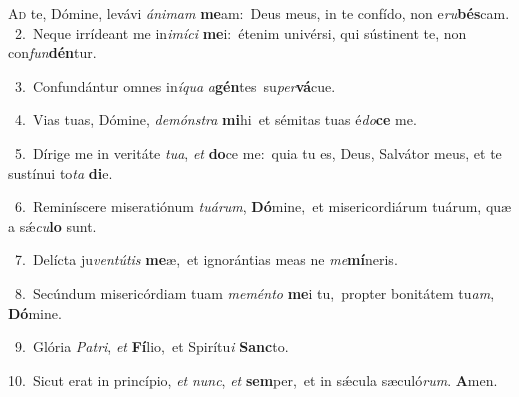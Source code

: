 \lettrine{\initial\textcolor{\initialcolor}{A}}{d} te, Dómine, levávi \textit{á}\-\textit{ni}\textit{mam} \textbf{me}\-am:~\star Deus meus, in te confído, non e\-\textit{ru}\-\textbf{bés}cam.\\
{\numbfont\textcolor{\numbcolor}{~2.}}~Neque irrídeant me in\-\textit{i}\-\textit{mí}\textit{ci} \textbf{me}\-i:~\star étenim univérsi, qui sústinent te, non con\-\textit{fun}\-\textbf{dén}tur.\par
{\numbfont\textcolor{\numbcolor}{~3.}}~Confundántur omnes in\-\textit{í}\-\textit{qua} \textit{a}\-\textbf{gén}tes~\star su\-\textit{per}\-\textbf{vá}cue.\par
{\numbfont\textcolor{\numbcolor}{~4.}}~Vias tuas, Dómine, \textit{de}\-\textit{móns}\textit{tra} \textbf{mi}\-hi~\star et sémitas tuas é\-\textit{do}\-\textbf{ce} me.\par
{\numbfont\textcolor{\numbcolor}{~5.}}~Dírige me in veritáte \textit{tu}\-\textit{a}, \textit{et} \textbf{do}\-ce me:~\star quia tu es, Deus, Salvátor meus, et te sustínui to\textit{ta} \textbf{di}\-e.\par
{\numbfont\textcolor{\numbcolor}{~6.}}~Reminíscere miseratiónum \textit{tu}\-\textit{á}\textit{rum}, \textbf{Dó}\-mine,~\star et misericordiárum tuárum, quæ a sǽ\-\textit{cu}\-\textbf{lo} sunt.\par
{\numbfont\textcolor{\numbcolor}{~7.}}~Delícta ju\-\textit{ven}\-\textit{tú}\textit{tis} \textbf{me}\-æ,~\star et ignorántias meas ne \textit{me}\-\textbf{mí}neris.\par
{\numbfont\textcolor{\numbcolor}{~8.}}~Secúndum misericórdiam tuam \textit{me}\-\textit{mén}\textit{to} \textbf{me}\-i tu,~\star propter bonitátem tu\-\textit{am}\-, \textbf{Dó}\-mine.\par
{\numbfont\textcolor{\numbcolor}{~9.}}~Glória \textit{Pa}\-\textit{tri}, \textit{et} \textbf{Fí}\-lio,~\star et Spirítu\textit{i} \textbf{Sanc}\-to.\par
{\numbfont\textcolor{\numbcolor}{10.}}~Sicut erat in princípio, \textit{et} \textit{nunc}\-, \textit{et} \textbf{sem}\-per,~\star et in sǽcula sæculó\-\textit{rum}\-. \textbf{A}\-men.\par
